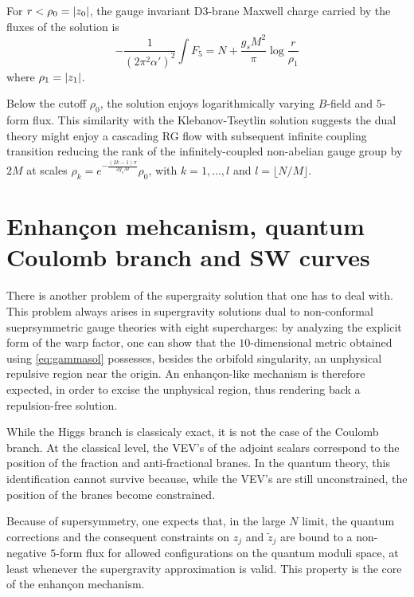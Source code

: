     For $r<\rho_0=\abs{z_0}$, the gauge invariant D$3$-brane Maxwell charge carried by the fluxes of the solution is
    \begin{equation}
        -\frac{1}{(2\pi^2\alpha')^2}\int F_5=N+\frac{g_sM^2}{\pi}\log\frac{r}{\rho_1}\label{eq:flux2}
    \end{equation}
    where $\rho_1=\abs{z_1}$.

    \begin{mybox}
        Below the cutoff $\rho_0$, the solution enjoys logarithmically varying $B$-field and $5$-form flux. This similarity with the Klebanov-Tseytlin solution suggests the dual theory might enjoy a cascading RG flow with subsequent infinite coupling transition reducing the rank of the infinitely-coupled non-abelian gauge group by $2M$ at scales $\rho_k=e^{-\frac{(2k-1)\pi}{2g_sM}}\rho_0$, with $k=1,\dots,l$ and $l=\lfloor N/M \rfloor$.
    \end{mybox}

\section{Enhançon mehcanism, quantum Coulomb branch and SW curves}

    There is another problem of the supergraity solution that one has to deal with. This problem always arises in supergravity solutions dual to non-conformal sueprsymmetric gauge theories with eight supercharges: by analyzing the explicit form of the warp factor, one can show that the $10$-dimensional metric obtained using \eqref{eq:gammasol} possesses, besides the orbifold singularity, an unphysical repulsive region near the origin. An enhançon-like mechanism is therefore expected, in order to excise the unphysical region, thus rendering back a repulsion-free solution.

    While the Higgs branch is classicaly exact, it is not the case of the Coulomb branch. At the classical level, the VEV's of the adjoint scalars correspond to the position of the fraction and anti-fractional branes. In the quantum theory, this identification cannot survive because, while the VEV's are still unconstrained, the position of the branes become constrained.
        
    Because of supersymmetry, one expects that, in the large $N$ limit, the quantum corrections and the consequent constraints on $z_j$ and $\tilde{z}_j$ are bound to a non-negative $5$-form flux for allowed configurations on the quantum moduli space, at least whenever the supergravity approximation is valid. This property is the core of the enhançon mechanism.

